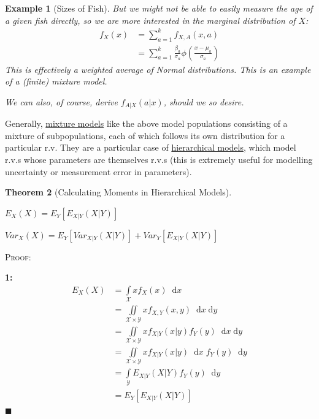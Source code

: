 \documentclass[12pt,a4paper]{article}
\newtheorem{thm}{Theorem}[subsection]
\newtheorem{ex}[thm]{Example}
\newcommand{\diff}{\;\mathrm{d}}
\begin{document}
\begin{ex}[Sizes of Fish]
But we might not be able to easily measure the age of a given fish directly, so we are more interested in the marginal distribution of $X$:
\begin{align*}
f_X(x) &= \sum_{a=1}^k f_{X,A}(x,a)\\
&= \sum_{a=1}^k \frac{\beta_a}{\sigma_a} \phi\left(\frac{x-\mu_a}{\sigma_a}\right)
\end{align*}
This is effectively a weighted average of Normal distributions. This is an example of a (finite) mixture model.

We can also, of course, derive $f_{A|X}(a|x)$, should we so desire.

\end{ex}

Generally, \underline{mixture models} like the above model populations consisting of a mixture of subpopulations, each of which follows its own distribution for a particular r.v. They are a particular case of \underline{hierarchical models}, which model r.v.s whose parameters are themselves r.v.s (this is extremely useful for modelling uncertainty or measurement error in parameters).

\begin{thm}[Calculating Moments in Hierarchical Models]\label{iterated expectation}$\;$\par\vspace{1cm}

 $E_{X}(X) = E_{Y}[E_{{X|Y}}(X|Y)]$

 $Var_{X}(X) = E_{Y}[Var_{{X|Y}}(X|Y)] + Var_{Y}[E_{{X|Y}}(X|Y)]$

\end{thm}

\noindent\textsc{Proof:}\par\vspace{1cm}

{\bf1: }
\begin{align*}
E_{X}(X) &= \int\limits_{\mathcal{X}}\!\! xf_X(x)\;\diff x\\
&= \iint\limits_{\mathcal{X}\times\mathcal{Y}}\!\! xf_{X,Y}(x,y)\;\diff x \diff y\\
&= \iint\limits_{\mathcal{X}\times\mathcal{Y}}\!\! xf_{X|Y}(x|y) f_Y(y)\; \diff x \diff y\\
&= \iint\limits_{\mathcal{X}\times\mathcal{Y}}\!\! xf_{X|Y}(x|y)\;\diff x\; f_Y(y)\; \diff y\\
&= \int\limits_{\mathcal{Y}}\!\! E_{{X|Y}}(X|Y) f_Y(y)\; \diff y\\
&= E_{Y}[E_{X|Y}(X|Y)]
\end{align*} \hfill$\blacksquare$
\end{document}
